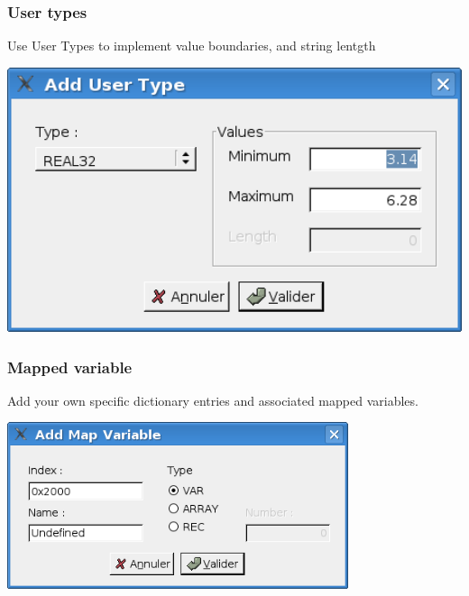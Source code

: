 \documentclass[12pt,twoside]{article}
\begin{document}
\subsubsection{User types}
Use User Types to implement value boundaries, and string lentgth\newline
 \begin{center}
   \includegraphics[width=15cm]{Pictures/10000201000001C40000010766961D7F.png}
\end{center}

\subsubsection{Mapped variable}
Add your own specific dictionary entries and associated mapped
variables.\newline
 \begin{center}
   \includegraphics[width=10cm]{Pictures/10000201000001C4000000DD129D4661.png}
\end{center}
\end{document}
